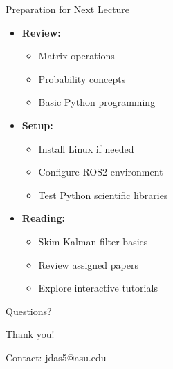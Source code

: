 \documentclass[aspectratio=169]{beamer}
\begin{document}
\begin{frame}{Preparation for Next Lecture}
    \begin{itemize}
        \item<1-> \textbf{Review:}
            \begin{itemize}
                \item Matrix operations
                \item Probability concepts
                \item Basic Python programming
            \end{itemize}
        \item<2-> \textbf{Setup:}
            \begin{itemize}
                \item Install Linux if needed
                \item Configure ROS2 environment
                \item Test Python scientific libraries
            \end{itemize}
        \item<3-> \textbf{Reading:}
            \begin{itemize}
                \item Skim Kalman filter basics
                \item Review assigned papers
                \item Explore interactive tutorials
            \end{itemize}
    \end{itemize}
\end{frame}

\begin{frame}{Questions?}
    \begin{center}
        \Huge Thank you!
        
        \vspace{1cm}
        \normalsize
        Contact: jdas5@asu.edu
    \end{center}
\end{frame}
\end{document}

